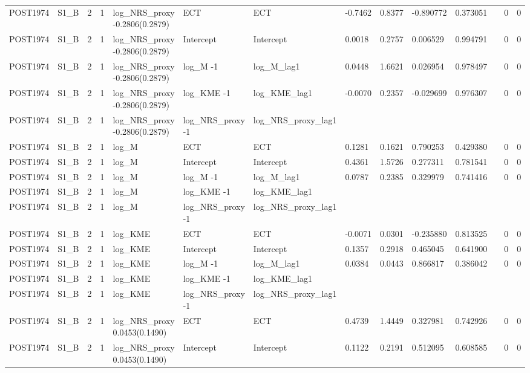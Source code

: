 \begin{tabular}{llllllllllllll}
POST1974 & S1\_B & 2 & 1 & log\_NRS\_proxy -0.2806(0.2879) & ECT & ECT & -0.7462 & 0.8377 & -0.890772 & 0.373051 &  & 0 & 0 \\
POST1974 & S1\_B & 2 & 1 & log\_NRS\_proxy -0.2806(0.2879) & Intercept & Intercept & 0.0018 & 0.2757 & 0.006529 & 0.994791 &  & 0 & 0 \\
POST1974 & S1\_B & 2 & 1 & log\_NRS\_proxy -0.2806(0.2879) & log\_M -1 & log\_M\_lag1 & 0.0448 & 1.6621 & 0.026954 & 0.978497 &  & 0 & 0 \\
POST1974 & S1\_B & 2 & 1 & log\_NRS\_proxy -0.2806(0.2879) & log\_KME -1 & log\_KME\_lag1 & -0.0070 & 0.2357 & -0.029699 & 0.976307 &  & 0 & 0 \\
POST1974 & S1\_B & 2 & 1 & log\_NRS\_proxy -0.2806(0.2879) & log\_NRS\_proxy -1 & log\_NRS\_proxy\_lag1 &  &  &  &  &  &  &  \\
POST1974 & S1\_B & 2 & 1 & log\_M & ECT & ECT & 0.1281 & 0.1621 & 0.790253 & 0.429380 &  & 0 & 0 \\
POST1974 & S1\_B & 2 & 1 & log\_M & Intercept & Intercept & 0.4361 & 1.5726 & 0.277311 & 0.781541 &  & 0 & 0 \\
POST1974 & S1\_B & 2 & 1 & log\_M & log\_M -1 & log\_M\_lag1 & 0.0787 & 0.2385 & 0.329979 & 0.741416 &  & 0 & 0 \\
POST1974 & S1\_B & 2 & 1 & log\_M & log\_KME -1 & log\_KME\_lag1 &  &  &  &  &  &  &  \\
POST1974 & S1\_B & 2 & 1 & log\_M & log\_NRS\_proxy -1 & log\_NRS\_proxy\_lag1 &  &  &  &  &  &  &  \\
POST1974 & S1\_B & 2 & 1 & log\_KME & ECT & ECT & -0.0071 & 0.0301 & -0.235880 & 0.813525 &  & 0 & 0 \\
POST1974 & S1\_B & 2 & 1 & log\_KME & Intercept & Intercept & 0.1357 & 0.2918 & 0.465045 & 0.641900 &  & 0 & 0 \\
POST1974 & S1\_B & 2 & 1 & log\_KME & log\_M -1 & log\_M\_lag1 & 0.0384 & 0.0443 & 0.866817 & 0.386042 &  & 0 & 0 \\
POST1974 & S1\_B & 2 & 1 & log\_KME & log\_KME -1 & log\_KME\_lag1 &  &  &  &  &  &  &  \\
POST1974 & S1\_B & 2 & 1 & log\_KME & log\_NRS\_proxy -1 & log\_NRS\_proxy\_lag1 &  &  &  &  &  &  &  \\
POST1974 & S1\_B & 2 & 1 & log\_NRS\_proxy 0.0453(0.1490) & ECT & ECT & 0.4739 & 1.4449 & 0.327981 & 0.742926 &  & 0 & 0 \\
POST1974 & S1\_B & 2 & 1 & log\_NRS\_proxy 0.0453(0.1490) & Intercept & Intercept & 0.1122 & 0.2191 & 0.512095 & 0.608585 &  & 0 & 0 \\

\end{tabular}
